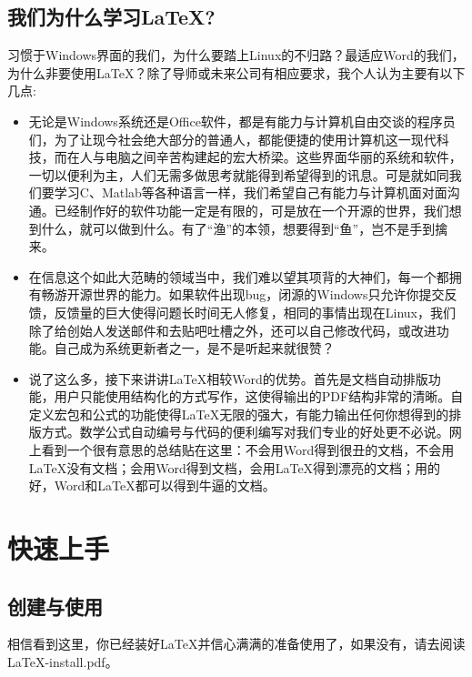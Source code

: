 \documentclass{article}
\begin{document}
\subsection{我们为什么学习\LaTeX ?}

习惯于Windows界面的我们，为什么要踏上Linux的不归路？最适应Word的我们，为什么非要使用\LaTeX ？除了导师或未来公司有相应要求，我个人认为主要有以下几点:

\begin{itemize}
\item 无论是Windows系统还是Office软件，都是有能力与计算机自由交谈的程序员们，为了让现今社会绝大部分的普通人，都能便捷的使用计算机这一现代科技，而在人与电脑之间辛苦构建起的宏大桥梁。这些界面华丽的系统和软件，一切以便利为主，人们无需多做思考就能得到希望得到的讯息。可是就如同我们要学习C、Matlab等各种语言一样，我们希望自己有能力与计算机面对面沟通。已经制作好的软件功能一定是有限的，可是放在一个开源的世界，我们想到什么，就可以做到什么。有了“渔”的本领，想要得到“鱼”，岂不是手到擒来。

\item 在信息这个如此大范畴的领域当中，我们难以望其项背的大神们，每一个都拥有畅游开源世界的能力。如果软件出现bug，闭源的Windows只允许你提交反馈，反馈量的巨大使得问题长时间无人修复，相同的事情出现在Linux，我们除了给创始人发送邮件和去贴吧吐槽之外，还可以自己修改代码，或改进功能。自己成为系统更新者之一，是不是听起来就很赞？

\item 说了这么多，接下来讲讲\LaTeX 相较Word的优势。首先是文档自动排版功能，用户只能使用结构化的方式写作，这使得输出的PDF结构非常的清晰。自定义宏包和公式的功能使得\LaTeX 无限的强大，有能力输出任何你想得到的排版方式。数学公式自动编号与代码的便利编写对我们专业的好处更不必说。网上看到一个很有意思的总结贴在这里：不会用Word得到很丑的文档，不会用\LaTeX 没有文档；会用Word得到文档，会用\LaTeX 得到漂亮的文档；用的好，Word和\LaTeX 都可以得到牛逼的文档。
\end{itemize}
\newpage
\section{快速上手}

\subsection{创建与使用}

相信看到这里，你已经装好\LaTeX 并信心满满的准备使用了，如果没有，请去阅读LaTeX-install.pdf。
\end{document}
